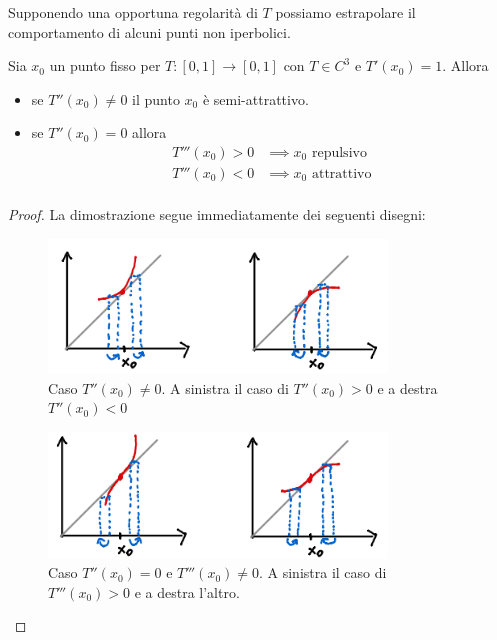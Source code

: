 Supponendo una opportuna regolarit\`a di $T$ possiamo estrapolare il comportamento di alcuni punti non iperbolici. 
\begin{proposition}\label{CriterioPuntiNonIperboliciDerivataPositiva}
Sia $x_0$ un punto fisso per $T:[0,1]\to[0,1]$ con $T\in C^3$ e $T'(x_0)=1$. Allora
\begin{itemize}
\item se $T''(x_0)\neq 0$ il punto $x_0$ \`e semi-attrattivo.
\item se $T''(x_0)=0$ allora
\begin{align*}
T'''(x_0)>0&\implies x_0\text{ repulsivo}\\
T'''(x_0)<0&\implies x_0\text{ attrattivo}\\
\end{align*}
\end{itemize}
\end{proposition}


\begin{proof}
La dimostrazione segue immediatamente dei seguenti disegni:

\begin{figure}[!htb]
	\centering
	\includegraphics[width=9cm]{Immagini/T''_non_nulla.png}
	\caption{Caso $T''(x_0)\neq 0$. A sinistra il caso di $T''(x_0)>0$ e a destra $T''(x_0)<0$}
\end{figure}

\begin{figure}[!htb]
	\centering
	\includegraphics[width=9cm]{Immagini/T'''_non_nulla.png}
	\caption{Caso $T''(x_0)=0$ e $T'''(x_0)\neq 0$. A sinistra il caso di $T'''(x_0)>0$ e a destra l'altro.}
\end{figure}
\end{proof}
	
